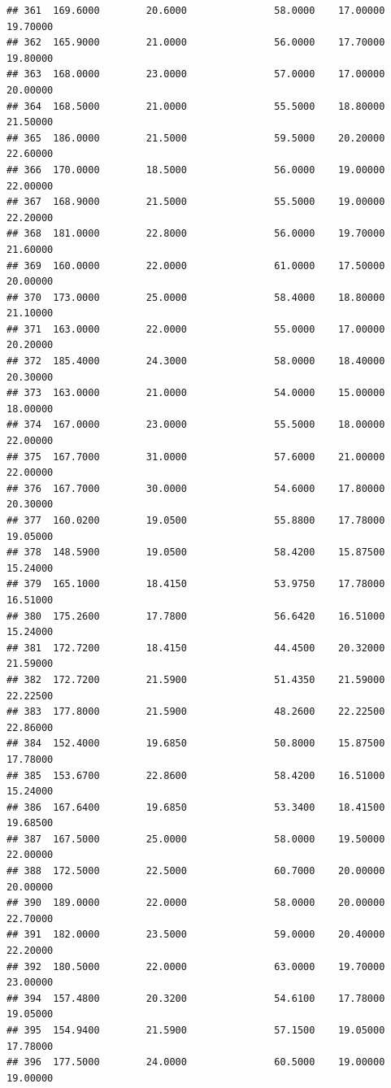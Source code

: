 \documentclass[]{article}
\begin{document}
\begin{verbatim}
## 361  169.6000        20.6000               58.0000    17.00000   19.70000
## 362  165.9000        21.0000               56.0000    17.70000   19.80000
## 363  168.0000        23.0000               57.0000    17.00000   20.00000
## 364  168.5000        21.0000               55.5000    18.80000   21.50000
## 365  186.0000        21.5000               59.5000    20.20000   22.60000
## 366  170.0000        18.5000               56.0000    19.00000   22.00000
## 367  168.9000        21.5000               55.5000    19.00000   22.20000
## 368  181.0000        22.8000               56.0000    19.70000   21.60000
## 369  160.0000        22.0000               61.0000    17.50000   20.00000
## 370  173.0000        25.0000               58.4000    18.80000   21.10000
## 371  163.0000        22.0000               55.0000    17.00000   20.20000
## 372  185.4000        24.3000               58.0000    18.40000   20.30000
## 373  163.0000        21.0000               54.0000    15.00000   18.00000
## 374  167.0000        23.0000               55.5000    18.00000   22.00000
## 375  167.7000        31.0000               57.6000    21.00000   22.00000
## 376  167.7000        30.0000               54.6000    17.80000   20.30000
## 377  160.0200        19.0500               55.8800    17.78000   19.05000
## 378  148.5900        19.0500               58.4200    15.87500   15.24000
## 379  165.1000        18.4150               53.9750    17.78000   16.51000
## 380  175.2600        17.7800               56.6420    16.51000   15.24000
## 381  172.7200        18.4150               44.4500    20.32000   21.59000
## 382  172.7200        21.5900               51.4350    21.59000   22.22500
## 383  177.8000        21.5900               48.2600    22.22500   22.86000
## 384  152.4000        19.6850               50.8000    15.87500   17.78000
## 385  153.6700        22.8600               58.4200    16.51000   15.24000
## 386  167.6400        19.6850               53.3400    18.41500   19.68500
## 387  167.5000        25.0000               58.0000    19.50000   22.00000
## 388  172.5000        22.5000               60.7000    20.00000   20.00000
## 390  189.0000        22.0000               58.0000    20.00000   22.70000
## 391  182.0000        23.5000               59.0000    20.40000   22.20000
## 392  180.5000        22.0000               63.0000    19.70000   23.00000
## 394  157.4800        20.3200               54.6100    17.78000   19.05000
## 395  154.9400        21.5900               57.1500    19.05000   17.78000
## 396  177.5000        24.0000               60.5000    19.00000   19.00000

\end{verbatim}
\end{document}
